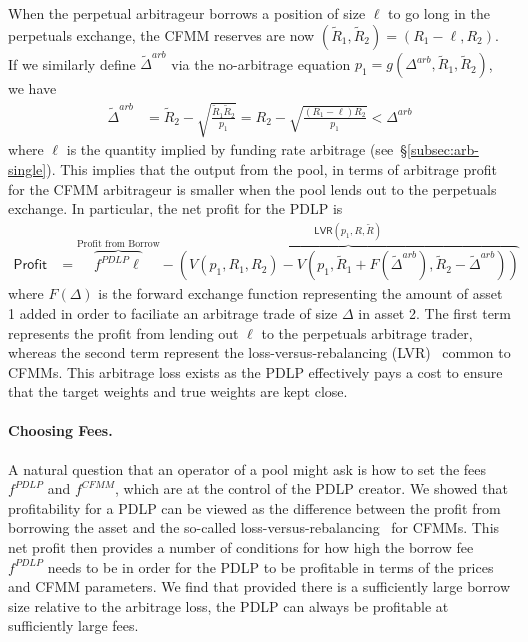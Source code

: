 When the perpetual arbitrageur borrows a position of size $\ell$ to go long in the perpetuals exchange, the CFMM reserves are now $(\tilde{R}_1, \tilde{R}_2) = (R_1 - \ell, R_2)$.
If we similarly define $\tilde{\Delta}^{arb}$ via the no-arbitrage equation $p_1 = g(\Delta^{arb}, \tilde{R}_1, \tilde{R}_2)$, we have 
\begin{align*}
    \tilde{\Delta}^{arb} &= \tilde{R}_2 - \sqrt{\frac{\tilde{R}_1 \tilde{R}_2}{p_1}} = R_2 - \sqrt{\frac{(R_1 - \ell)R_2}{p_1}} < \Delta^{arb}
\end{align*}
where $\ell$ is the quantity implied by funding rate arbitrage (see~\S\ref{subsec:arb-single}).
This implies that the output from the pool, in terms of arbitrage profit for the CFMM arbitrageur is smaller when the pool lends out to the perpetuals exchange.
In particular, the net profit for the PDLP is
\begin{align}\label{eq:profit-lvr}
\mathsf{Profit} &= \overbrace{f^{PDLP} \ell}^{\text{Profit from Borrow}} - \overbrace{(V(p_1, R_1, R_2) - V(p_1, \tilde{R}_1 + F(\tilde{\Delta}^{arb}), \tilde{R}_2 - \tilde{\Delta}^{arb}))}^{\mathsf{LVR}(p_1, R, \tilde{R})}
\end{align}
where $F(\Delta)$ is the forward exchange function representing the amount of asset 1 added in order to faciliate an arbitrage trade of size $\Delta$ in asset 2.
The first term represents the profit from lending out $\ell$ to the perpetuals arbitrage trader, whereas the second term represent the loss-versus-rebalancing (LVR)~\cite{milionis2022automated} common to CFMMs.
This arbitrage loss exists as the PDLP effectively pays a cost to ensure that the target weights and true weights are kept close.

\paragraph{Choosing Fees.}
A natural question that an operator of a pool might ask is how to set the fees $f^{PDLP}$ and $f^{CFMM}$, which are at the control of the PDLP creator.
We showed that profitability for a PDLP can be viewed as the difference between the profit from borrowing the asset and the so-called loss-versus-rebalancing~\cite{milionis2022automated} for CFMMs.
This net profit then provides a number of conditions for how high the borrow fee $f^{PDLP}$ needs to be in order for the PDLP to be profitable in terms of the prices and CFMM parameters.
We find that provided there is a sufficiently large borrow size relative to the arbitrage loss, the PDLP can always be profitable at sufficiently large fees.


